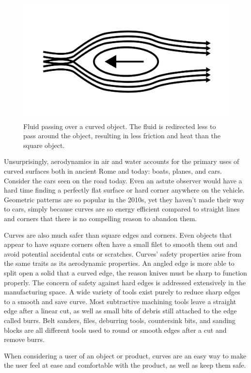 \documentclass[12pt,letterpaper]{article}
\begin{document}
\begin{figure}[H]
\includegraphics[width=12cm]{aero-curve}
\centering
\caption{Fluid passing over a curved object. The fluid is redirected less to pass around the object, resulting in less friction and heat than the square object.}
\end{figure}

Unsurprisingly, aerodynamics in air and water accounts for the primary uses of curved surfaces both in ancient Rome and today: boats, planes, and cars. Consider the cars seen on the road today. Even an astute observer would have a hard time finding a perfectly flat surface or hard corner anywhere on the vehicle. Geometric patterns are so popular in the 2010s, yet they haven’t made their way to cars, simply because curves are so energy efficient compared to straight lines and corners that there is no compelling reason to abandon them. 

Curves are also much safer than square edges and corners. Even objects that appear to have square corners often have a small filet to smooth them out and avoid potential accidental cuts or scratches. Curves’ safety properties arise from the same traits as its aerodynamic properties. An angled edge is more able to split open a solid that a curved edge, the reason knives must be sharp to function properly. The concern of safety against hard edges is addressed extensively in the manufacturing space. A wide variety of tools exist purely to reduce sharp edges to a smooth and save curve. Most subtractive machining tools leave a straight edge after a linear cut, as well as small bits of debris still attached to the edge called burrs. Belt sanders, files, deburring tools, countersink bits, and sanding blocks are all different tools used to round or smooth edges after a cut and remove burrs.

When considering a user of an object or product, curves are an easy way to make the user feel at ease and comfortable with the product, as well as keep them safe. 
\end{document}
